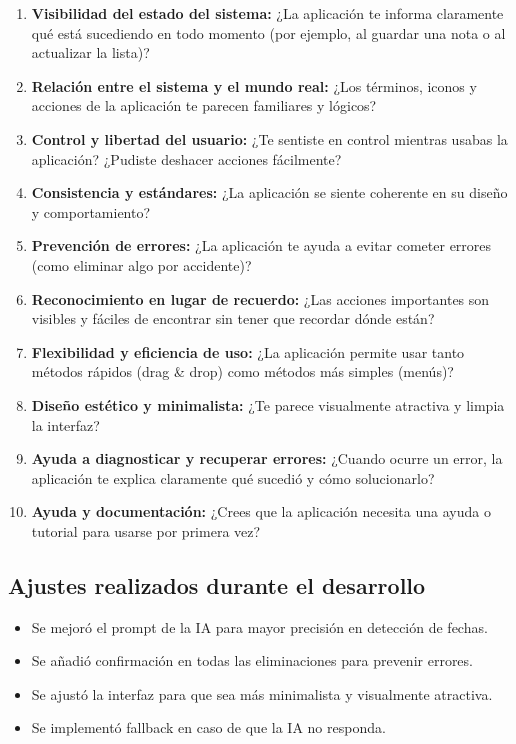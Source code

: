 \documentclass[12pt,a4paper]{article}
\begin{document}
\begin{enumerate}
    \item \textbf{Visibilidad del estado del sistema:} ¿La aplicación te informa claramente qué está sucediendo en todo momento (por ejemplo, al guardar una nota o al actualizar la lista)?
    
    \item \textbf{Relación entre el sistema y el mundo real:} ¿Los términos, iconos y acciones de la aplicación te parecen familiares y lógicos?
    
    \item \textbf{Control y libertad del usuario:} ¿Te sentiste en control mientras usabas la aplicación? ¿Pudiste deshacer acciones fácilmente?
    
    \item \textbf{Consistencia y estándares:} ¿La aplicación se siente coherente en su diseño y comportamiento?
    
    \item \textbf{Prevención de errores:} ¿La aplicación te ayuda a evitar cometer errores (como eliminar algo por accidente)?
    
    \item \textbf{Reconocimiento en lugar de recuerdo:} ¿Las acciones importantes son visibles y fáciles de encontrar sin tener que recordar dónde están?
    
    \item \textbf{Flexibilidad y eficiencia de uso:} ¿La aplicación permite usar tanto métodos rápidos (drag \& drop) como métodos más simples (menús)?
    
    \item \textbf{Diseño estético y minimalista:} ¿Te parece visualmente atractiva y limpia la interfaz?
    
    \item \textbf{Ayuda a diagnosticar y recuperar errores:} ¿Cuando ocurre un error, la aplicación te explica claramente qué sucedió y cómo solucionarlo?
    
    \item \textbf{Ayuda y documentación:} ¿Crees que la aplicación necesita una ayuda o tutorial para usarse por primera vez?
\end{enumerate}

\subsection{Ajustes realizados durante el desarrollo}
\begin{itemize}
    \item Se mejoró el prompt de la IA para mayor precisión en detección de fechas.
    \item Se añadió confirmación en todas las eliminaciones para prevenir errores.
    \item Se ajustó la interfaz para que sea más minimalista y visualmente atractiva.
    \item Se implementó fallback en caso de que la IA no responda.
\end{itemize}
\end{document}
